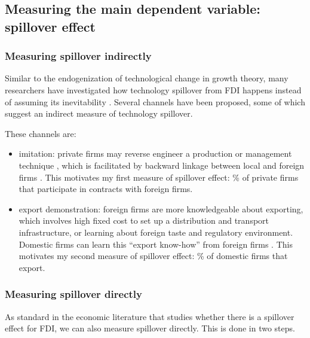 \subsection{Measuring the main dependent variable: spillover effect}
\label{sec:rd_measure_spillover}

\subsubsection*{Measuring spillover indirectly}

Similar to the endogenization of technological change in growth theory, many researchers have investigated how technology spillover from FDI happens instead of assuming its inevitability \citep{Romer1994}. Several channels have been proposed, some of which suggest an indirect measure of technology spillover.

These channels are:
\begin{itemize}
	\item imitation:  private firms may reverse engineer a production or management technique \citep{Wang1992}, which is facilitated by backward linkage between local and foreign firms \citep{Javorcik2004}. This motivates my first measure of spillover effect: \% of private firms that participate in contracts with foreign firms.
\item export demonstration: foreign firms are more knowledgeable about exporting, which involves high fixed cost to set up a distribution and transport infrastructure, or learning about foreign taste and regulatory environment. Domestic firms can learn this ``export know-how'' from foreign firms \citep{Aitken1997}. This motivates my second measure of spillover effect: \% of domestic firms that export.
\end{itemize}

\subsubsection*{Measuring spillover directly}

As standard in the economic literature that studies whether there is a spillover effect for FDI, we can also measure spillover directly. This is done in two steps.


